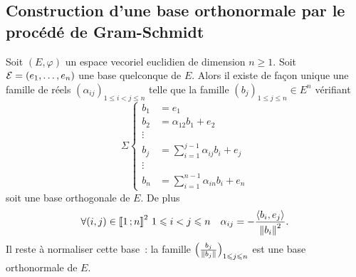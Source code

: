 \subsection{Construction d'une base orthonormale par le procédé de Gram-Schmidt}

\begin{theo}
  Soit \((E,\varphi)\) un espace vecoriel euclidien de dimension \(n \geqslant 1\). Soit \(\mathcal{E}=(e_1, \ldots, e_n)\) une base quelconque de \(E\). Alors il existe de façon unique une famille de réels \((\alpha_{ij})_{1 \leqslant i<j \leqslant n}\) telle que la famille \((b_j)_{1 \leqslant j \leqslant n} \in E^n\) vérifiant
  \begin{equation} \Sigma
    \begin{cases}
      b_1 & = e_1 \\
      b_2 & = \alpha_{12}b_1 +e_2 \\
      \vdots & \\
      b_j & = \sum_{i=1}^{j-1} \alpha_{ij}b_i  + e_j \\
      \vdots & \\
      b_n & = \sum_{i=1}^{n-1} \alpha_{in}b_i  + e_n
    \end{cases}
  \end{equation}
  soit une base orthogonale de \(E\). De plus
  \begin{equation}
    \forall (i,j) \in \mathopen{\llbracket}1\mathclose{}\mathpunct{};n\mathclose{\rrbracket}^2 \ 1 \leqslant i < j \leqslant n \quad \alpha_{ij} = -\frac{\left\langle{b_i},{e_j}\right\rangle}{\left\lVert b_i\right\rVert^2}.
  \end{equation}
  Il reste à normaliser cette base~: la famille \(\left(\frac{b_j}{\left\lVert b_j\right\rVert}\right)_{1 \leqslant j \leqslant n}\) est une base orthonormale de \(E\).
\end{theo}
